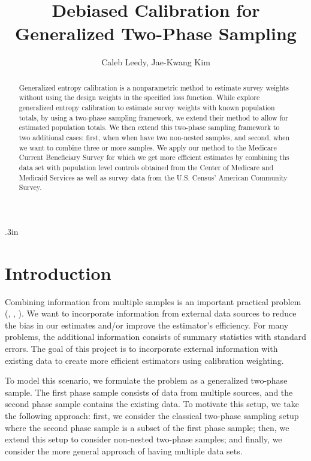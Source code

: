 \documentclass[12pt]{article}
\begin{document}
\title{Debiased Calibration for Generalized Two-Phase Sampling}
\author{Caleb Leedy, Jae-Kwang Kim}
\maketitle 

\baselineskip .3in

\begin{abstract}
Generalized entropy calibration \cite{gneiting2007strictly} is a nonparametric
method to estimate survey weights without using the design weights in the
specified loss function. While \cite{kwon2024debiased} explore generalized
entropy calibration to estimate survey weights with known population totals, by
using a two-phase sampling framework, we extend their method to allow for
estimated population totals. We then extend this two-phase sampling framework to
two additional cases: first, when when have two non-nested samples, and
second, when we want to combine three or more samples. 
We apply our method to the Medicare Current Beneficiary Survey for which we
get more efficient estimates by combining ths data set with population level
controls obtained from the Center of Medicare and Medicaid Services as well as
survey data from the U.S. Census' American Community Survey.
\end{abstract}

\section{Introduction}

Combining information from multiple samples is an important practical problem
(\cite{yang2020statistical}, \cite{yang2023elastic}, \cite{dagdoug2023model}).
We want to incorporate information from external data sources to reduce the bias
in our estimates and/or improve the estimator's efficiency. For many problems, the
additional information consists of summary statistics with standard errors. The
goal of this project is to incorporate external information with existing data 
to create more efficient estimators using calibration weighting.

To model this scenario, we formulate the problem as a generalized two-phase
sample. The first phase sample consists of data from multiple sources, and the
second phase sample contains the existing data. To motivate this setup, we
take the following approach: first, we consider the classical two-phase
sampling setup where the second phase sample is a subset of the first phase
sample; then, we extend this setup to consider non-nested two-phase samples;
and finally, we consider the more general approach of having multiple data sets.
\end{document}
